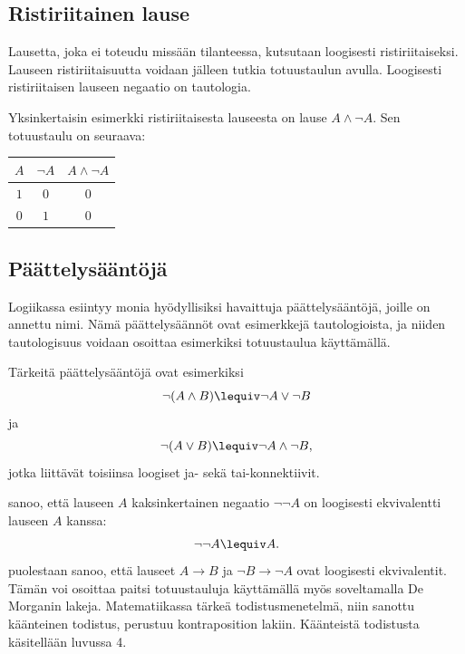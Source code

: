 \subsection*{Ristiriitainen lause}
Lausetta, joka ei toteudu missään tilanteessa, kutsutaan loogisesti ristiriitaiseksi. Lauseen ristiriitaisuutta voidaan jälleen tutkia totuustaulun avulla. Loogisesti ristiriitaisen lauseen negaatio on tautologia. 

Yksinkertaisin esimerkki ristiriitaisesta lauseesta on lause $A\land \lnot A$. Sen totuustaulu on seuraava:

\bigskip

\begin{center}
\begin{tabular}{|c|c|c|}\hline
$A$ & $\lnot A$ & $A \land  \lnot A$ \\ \hline
$1$ & $0$ & $0$\\
$0$ & $1$ & $0$\\ \hline
\end{tabular}
\end{center}

\bigskip


\subsection*{Päättelysääntöjä} Logiikassa esiintyy monia hyödyllisiksi havaittuja päättelysääntöjä, joille on annettu nimi. Nämä päättelysäännöt ovat esimerkkejä tautologioista, ja niiden tautologisuus voidaan osoittaa esimerkiksi totuustaulua käyttämällä.

Tärkeitä päättelysääntöjä ovat esimerkiksi 
\[
\lnot(A \land B) \lequiv \lnot A \lor \lnot B
\]
ja
\[
\lnot(A \lor B) \lequiv \lnot A \land \lnot B,
\]
jotka liittävät toisiinsa loogiset ja- sekä tai-konnektiivit.

 sanoo, että lauseen $A$ kaksinkertainen negaatio $\lnot \lnot A$ on loogisesti ekvivalentti lauseen $A$ kanssa:
\[
\lnot \lnot A \lequiv A.
\]
 puolestaan sanoo, että lauseet $A\to B$ ja $\lnot B \to \lnot A$ ovat loogisesti ekvivalentit. Tämän voi osoittaa paitsi totuustauluja käyttämällä myös soveltamalla De Morganin lakeja.
Matematiikassa tärkeä todistusmenetelmä, niin sanottu käänteinen todistus, perustuu kontraposition lakiin. Käänteistä todistusta käsitellään luvussa 4.


